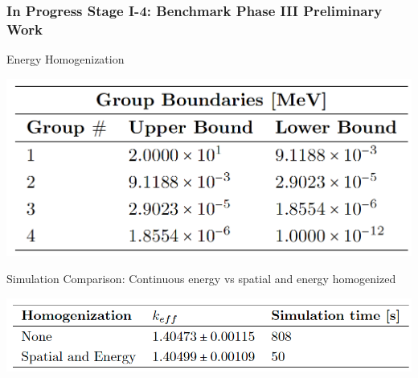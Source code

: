 \begin{frame}
    \frametitle{In Progress Stage I-4: Benchmark Phase III Preliminary Work}
    \begin{block}{Energy Homogenization}
        \begin{table}[]
            \centering
            \begin{minipage}[c]{0.6\textwidth}
                \centering
                \includegraphics[width=0.9\linewidth]{figures/ahtr-energy-discr.png}
            \end{minipage}\hfill
            \begin{minipage}[c]{0.4\textwidth}
            \caption{4-group energy structures for AHTR geometry 
            derived by \cite{gentry_development_2016}.}
        \end{minipage}
        \end{table}
    \end{block}
    \vspace{-0.3cm}
    \begin{block}{Simulation Comparison: Continuous energy vs spatial 
        and energy homogenized}
        \begin{table}[]
                \centering
                \includegraphics[width=0.7\linewidth]{figures/ahtr-homogenization.png}
            \caption{
                AHTR fuel slab's $k_{eff}$ for case with continuous energy and 
                space and case with spatial and energy homogenization.}
        \end{table}
    \end{block}
\end{frame}